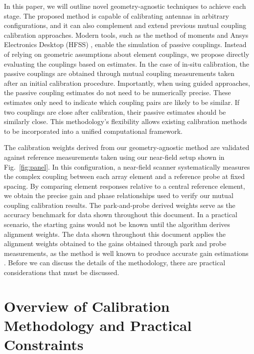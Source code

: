 \documentclass[journal]{IEEEtran}
\begin{document}
In this paper, we will outline novel geometry-agnostic techniques to achieve each stage. The proposed method is capable of calibrating antennas in arbitrary configurations, and it can also complement and extend previous mutual coupling calibration approaches. Modern tools, such as the method of moments \cite{balanisant,MCeffects} and Ansys Electronics Desktop (HFSS) \cite{HFSS}, enable the simulation of passive couplings. Instead of relying on geometric assumptions about element couplings, we propose directly evaluating the couplings based on estimates. In the case of in-situ calibration, the passive couplings are obtained through mutual coupling measurements taken after an initial calibration procedure. Importantly, when using guided approaches, the passive coupling estimates do not need to be numerically precise. These estimates only need to indicate which coupling pairs are likely to be similar. If two couplings are close after calibration, their passive estimates should be similarly close. This methodology’s flexibility allows existing calibration methods to be incorporated into a unified computational framework.

The calibration weights derived from our geometry-agnostic method are validated against reference measurements taken using our near-field setup shown in Fig.~\ref{fig:panel}. In this configuration, a near-field scanner systematically measures the complex coupling between each array element and a reference probe at fixed spacing. By comparing element responses relative to a central reference element, we obtain the precise gain and phase relationships used to verify our mutual coupling calibration results. The park-and-probe derived weights serve as the accuracy benchmark for data shown throughout this document. In a practical scenario, the starting gains would not be known until the algorithm derives alignment weights. The data shown throughout this document applies the alignment weights obtained to the gains obtained through park and probe measurements, as the method is well known to produce accurate gain estimations \cite{simpleParkProbe,fastSimplePP,seker,brown2014phased}. Before we can discuss the details of the methodology, there are practical considerations that must be discussed.

\section{Overview of Calibration Methodology and Practical Constraints}
\end{document}
